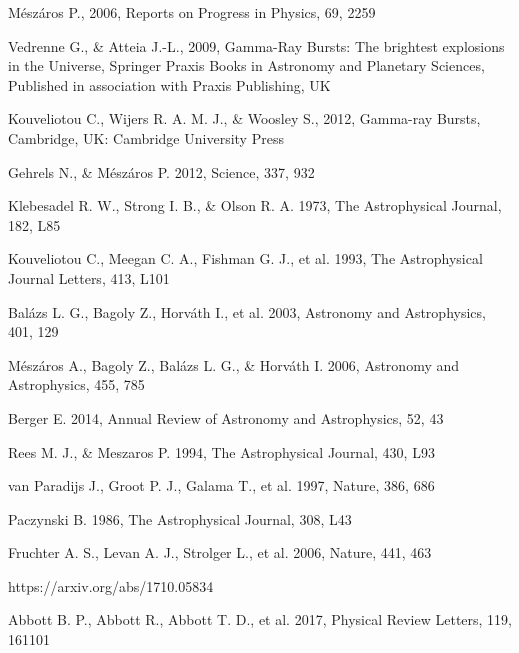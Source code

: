 \documentclass[12pt, a4paper,titlepage]{article}
\numberwithin{equation}{section}
\numberwithin{figure}{section}
\begin{document}
\pagebreak

\begin{thebibliography}{99}

 Mészáros P., 2006, Reports on Progress in Physics, 69, 2259

 Vedrenne G., \& Atteia J.-L., 2009, Gamma-Ray Bursts: The brightest explosions in the Universe,
Springer Praxis Books in Astronomy and Planetary Sciences, Published in association with Praxis
Publishing, UK

 Kouveliotou C., Wijers R. A. M. J., \& Woosley S., 2012, Gamma-ray Bursts, Cambridge, UK:
Cambridge University Press

 Gehrels N., \& Mészáros P. 2012, Science, 337, 932

 Klebesadel R. W., Strong I. B., \& Olson R. A. 1973, The Astrophysical Journal, 182, L85

 Kouveliotou C., Meegan C. A., Fishman G. J., et al. 1993, The Astrophysical Journal Letters, 413, L101

 Balázs L. G., Bagoly Z., Horváth I., et al. 2003, Astronomy and Astrophysics, 401, 129

 Mészáros A., Bagoly Z., Balázs L. G., \& Horváth I. 2006, Astronomy and Astrophysics, 455, 785

 Berger E. 2014, Annual Review of Astronomy and Astrophysics, 52, 43

 Rees M. J., \& Meszaros P. 1994, The Astrophysical Journal, 430, L93

 van Paradijs J., Groot P. J., Galama T., et al. 1997, Nature, 386, 686

 Paczynski B. 1986, The Astrophysical Journal, 308, L43

 Fruchter A. S., Levan A. J., Strolger L., et al. 2006, Nature, 441, 463

 https://arxiv.org/abs/1710.05834

 Abbott B. P., Abbott R., Abbott T. D., et al. 2017, Physical Review Letters, 119, 161101


\end{thebibliography}
\end{document}

